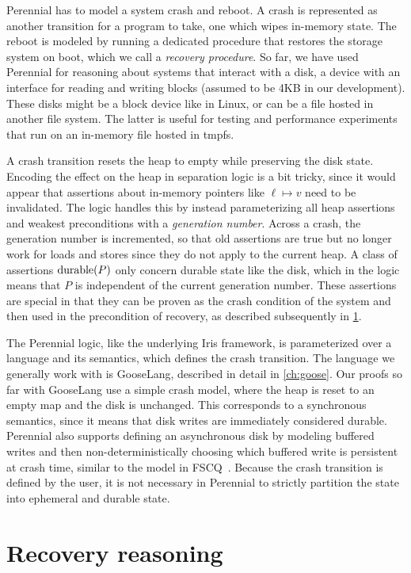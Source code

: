 Perennial has to model a system crash and reboot. A crash is represented as
another transition for a program to take, one which wipes in-memory state. The
reboot is modeled by running a dedicated procedure that restores the storage
system on boot, which we call a \emph{recovery procedure}. So far, we have used
Perennial for reasoning about systems that interact with a disk, a device with
an interface for reading and writing blocks (assumed to be 4KB in our
development). These disks might be a block device like  in Linux,
or can be a file hosted in another file system. The latter is useful for testing
and performance experiments that run on an in-memory file hosted in tmpfs.

A crash transition resets the heap to empty while preserving the disk state.
Encoding the effect on the heap in separation logic is a bit tricky, since it would appear that
assertions about in-memory pointers like $\ell \mapsto v$ need to be
invalidated. The logic handles this by instead parameterizing all heap
assertions and weakest preconditions with a \emph{generation number}. Across a
crash, the generation number is incremented, so that old assertions are true but
no longer work for loads and stores since they do not apply to the current heap.
A class of assertions $\operatorname{durable}(P)$ only concern durable state like the disk, which in the
logic means that $P$ is independent of the current generation number. These
assertions are special in that they can be proven as the crash condition of the
system and then used in the precondition of recovery, as described subsequently
in \cref{sec:perennial:recovery}.

The Perennial logic, like the underlying Iris framework, is parameterized over a
language and its semantics, which defines the crash transition. The
language we generally work with is GooseLang, described in detail in
\cref{ch:goose}. Our proofs so far with GooseLang use a simple crash model,
where the heap is reset to an empty map and the disk is unchanged. This
corresponds to a synchronous semantics, since it means that disk writes are
immediately considered durable. Perennial also supports defining an asynchronous
disk by modeling buffered writes and then non-deterministically choosing which
buffered write is persistent at crash time, similar to the model in
FSCQ~\cite{chen:fscq}. Because the crash transition is defined by the user, it
is not necessary in Perennial to strictly partition the state into ephemeral and
durable state.

\section{Recovery reasoning}
\label{sec:perennial:recovery}

